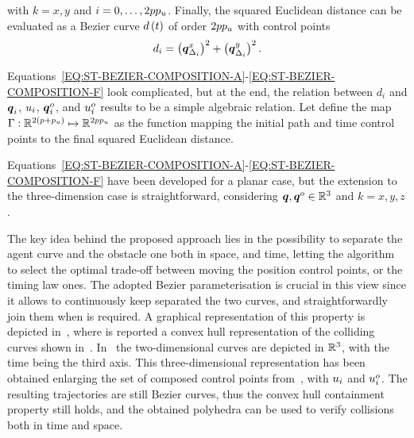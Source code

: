 with $k = x,y$ and $i = 0, \dots, 2p p_{u}$.
Finally, the squared Euclidean distance can be evaluated as a B\acuteacc ezier curve $d \left( t \right)$ of order $2p p_{u}$
with control points
\begin{equation}%
    \label{EQ:ST-BEZIER-COMPOSITION-F}
    d_i = \lp \bs{\cpoint}_{\Delta_i}^x \rp^2 + \lp \bs{\cpoint}_{\Delta_i}^y \rp^2.
\end{equation}
\begin{remark}
    Equations~\eqref{EQ:ST-BEZIER-COMPOSITION-A}-\eqref{EQ:ST-BEZIER-COMPOSITION-F} look complicated, but at the end, the relation
    between $d_i$ and $\boldsymbol{q}_i$, $u_i$, $\boldsymbol{q}_i^o$, and $u^o_i$ results to be a simple algebraic relation.
    Let define the map $\Gamma : \mathbb{R}^{2(p+p_{u})} \mapsto \mathbb{R}^{2 p p_{u}}$ as the function mapping the
    initial path and time control points to the final squared Euclidean distance.
\end{remark}
\begin{remark}
    Equations~\eqref{EQ:ST-BEZIER-COMPOSITION-A}-\eqref{EQ:ST-BEZIER-COMPOSITION-F} have been developed for a planar case,
    but the extension to the three-dimension case is straightforward, considering $\boldsymbol{q}, \boldsymbol{q}^o \in \mathbb{R}^3$ and
    $k = x,y,z$.
\end{remark}
The key idea behind the proposed approach lies in the possibility to separate the agent curve and the obstacle one both in space, and
time, letting the algorithm to select the optimal trade-off between moving the position control points, or the timing law ones.
The adopted B\acuteacc ezier parameterisation is crucial in this view since it allows to continuously keep separated the two curves, and
straightforwardly join them when is required. A graphical representation of this property is depicted in~,
where is reported a convex hull representation of the colliding curves shown in~.
In~ the two-dimensional curves are depicted in $\mathbb{R}^3$, with the time being the third axis.
This three-dimensional representation has been obtained enlarging the set of composed control points from~,
with $u_i$ and $u_i^o$. The resulting trajectories are still B\acuteacc ezier curves, thus the convex hull 
containment property still holds, and the obtained polyhedra can be used to verify collisions both in time and space.

